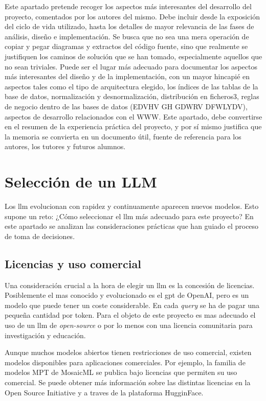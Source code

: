 
Este apartado pretende recoger los aspectos más interesantes del desarrollo del proyecto, comentados por los autores del mismo.
Debe incluir desde la exposición del ciclo de vida utilizado, hasta los detalles de mayor relevancia de las fases de análisis, diseño e implementación.
Se busca que no sea una mera operación de copiar y pegar diagramas y extractos del código fuente, sino que realmente se justifiquen los caminos de solución que se han tomado, especialmente aquellos que no sean triviales.
Puede ser el lugar más adecuado para documentar los aspectos más interesantes del diseño y de la implementación, con un mayor hincapié en aspectos tales como el tipo de arquitectura elegido, los índices de las tablas de la base de datos, normalización y desnormalización, distribución en ficheros3, reglas de negocio dentro de las bases de datos (EDVHV GH GDWRV DFWLYDV), aspectos de desarrollo relacionados con el WWW.
Este apartado, debe convertirse en el resumen de la experiencia práctica del proyecto, y por sí mismo justifica que la memoria se convierta en un documento útil, fuente de referencia para los autores, los tutores y futuros alumnos.

\section{Selección de un LLM}

Los \acrfull{llm} evolucionan con rapidez y continuamente aparecen nuevos modelos. Esto supone un reto: ¿Cómo seleccionar el \acrshort{llm} más adecuado para este proyecto? En este apartado se analizan las consideraciones prácticas que han guiado el proceso de toma de decisiones.

\subsection{Licencias y uso comercial}
Una consideración crucial a la hora de elegir un \acrshort{llm} es la concesión de licencias. Posiblemente el mas conocido y evolucionado es el \acrshort{gpt} de OpenAI, pero es un modelo que puede tener un coste considerable. En cada \textit{query} se ha de pagar una pequeña cantidad  por token. Para el objeto de este proyecto es mas adecuado el uso de un \acrshort{llm} de \textit{open-source} o por lo menos con una licencia comunitaria para investigación y educación.

Aunque muchos modelos abiertos tienen restricciones de uso comercial, existen modelos disponibles para aplicaciones comerciales. Por ejemplo, la familia de modelos MPT de MosaicML se publica bajo licencias que permiten su uso comercial. Se puede obtener más información sobre las distintas licencias en la Open Source Initiative y a traves de la plataforma HugginFace.

